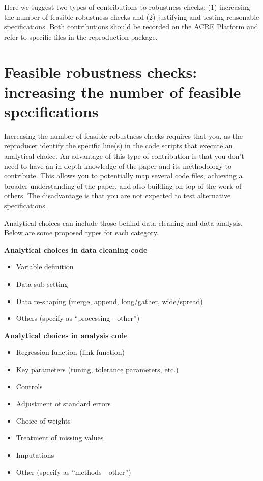 \documentclass[]{book}
\providecommand{\tightlist}{%
  \setlength{\itemsep}{0pt}\setlength{\parskip}{0pt}}
\begin{document}
Here we suggest two types of contributions to robustness checks: (1) increasing the number of feasible robustness checks and (2) justifying and testing reasonable specifications. Both contributions should be recorded on the ACRE Platform and refer to specific files in the reproduction package.

\hypertarget{feasible-robustness-checks-increasing-the-number-of-feasible-specifications}{%
\section{Feasible robustness checks: increasing the number of feasible specifications}\label{feasible-robustness-checks-increasing-the-number-of-feasible-specifications}}

Increasing the number of feasible robustness checks requires that you, as the reproducer identify the specific line(s) in the code scripts that execute an analytical choice. An advantage of this type of contribution is that you don't need to have an in-depth knowledge of the paper and its methodology to contribute. This allows you to potentially map several code files, achieving a broader understanding of the paper, and also building on top of the work of others. The disadvantage is that you are not expected to test alternative specifications.

Analytical choices can include those behind data cleaning and data analysis. Below are some proposed types for each category.

\textbf{Analytical choices in data cleaning code}

\begin{itemize}
\tightlist
\item
  Variable definition
\item
  Data sub-setting
\item
  Data re-shaping (merge, append, long/gather, wide/spread)
\item
  Others (specify as ``processing - other'')
\end{itemize}

\textbf{Analytical choices in analysis code}

\begin{itemize}
\tightlist
\item
  Regression function (link function)
\item
  Key parameters (tuning, tolerance parameters, etc.)
\item
  Controls
\item
  Adjustment of standard errors
\item
  Choice of weights
\item
  Treatment of missing values
\item
  Imputations
\item
  Other (specify as ``methods - other'')
\end{itemize}
\end{document}
